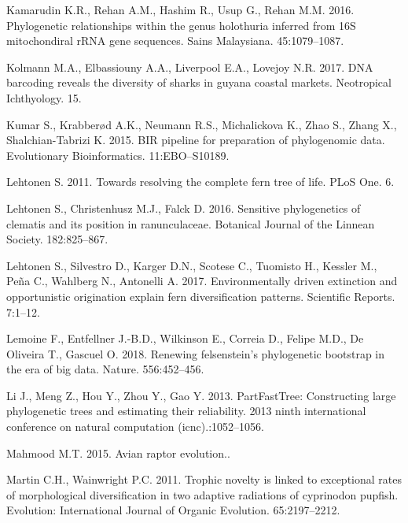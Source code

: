 \documentclass[]{article}
\begin{document}
\leavevmode\hypertarget{ref-kamarudin2016phylogenetic}{}%
Kamarudin K.R., Rehan A.M., Hashim R., Usup G., Rehan M.M. 2016. Phylogenetic relationships within the genus holothuria inferred from 16S mitochondiral rRNA gene sequences. Sains Malaysiana. 45:1079--1087.

\leavevmode\hypertarget{ref-kolmann2017dna}{}%
Kolmann M.A., Elbassiouny A.A., Liverpool E.A., Lovejoy N.R. 2017. DNA barcoding reveals the diversity of sharks in guyana coastal markets. Neotropical Ichthyology. 15.

\leavevmode\hypertarget{ref-kumar2015bir}{}%
Kumar S., Krabberød A.K., Neumann R.S., Michalickova K., Zhao S., Zhang X., Shalchian-Tabrizi K. 2015. BIR pipeline for preparation of phylogenomic data. Evolutionary Bioinformatics. 11:EBO--S10189.

\leavevmode\hypertarget{ref-lehtonen2011towards}{}%
Lehtonen S. 2011. Towards resolving the complete fern tree of life. PLoS One. 6.

\leavevmode\hypertarget{ref-lehtonen2016sensitive}{}%
Lehtonen S., Christenhusz M.J., Falck D. 2016. Sensitive phylogenetics of clematis and its position in ranunculaceae. Botanical Journal of the Linnean Society. 182:825--867.

\leavevmode\hypertarget{ref-lehtonen2017environmentally}{}%
Lehtonen S., Silvestro D., Karger D.N., Scotese C., Tuomisto H., Kessler M., Peña C., Wahlberg N., Antonelli A. 2017. Environmentally driven extinction and opportunistic origination explain fern diversification patterns. Scientific Reports. 7:1--12.

\leavevmode\hypertarget{ref-lemoine2018renewing}{}%
Lemoine F., Entfellner J.-B.D., Wilkinson E., Correia D., Felipe M.D., De Oliveira T., Gascuel O. 2018. Renewing felsenstein's phylogenetic bootstrap in the era of big data. Nature. 556:452--456.

\leavevmode\hypertarget{ref-li2013partfasttree}{}%
Li J., Meng Z., Hou Y., Zhou Y., Gao Y. 2013. PartFastTree: Constructing large phylogenetic trees and estimating their reliability. 2013 ninth international conference on natural computation (icnc).:1052--1056.

\leavevmode\hypertarget{ref-mahmood2015avian}{}%
Mahmood M.T. 2015. Avian raptor evolution..

\leavevmode\hypertarget{ref-martin2011trophic}{}%
Martin C.H., Wainwright P.C. 2011. Trophic novelty is linked to exceptional rates of morphological diversification in two adaptive radiations of cyprinodon pupfish. Evolution: International Journal of Organic Evolution. 65:2197--2212.
\end{document}
